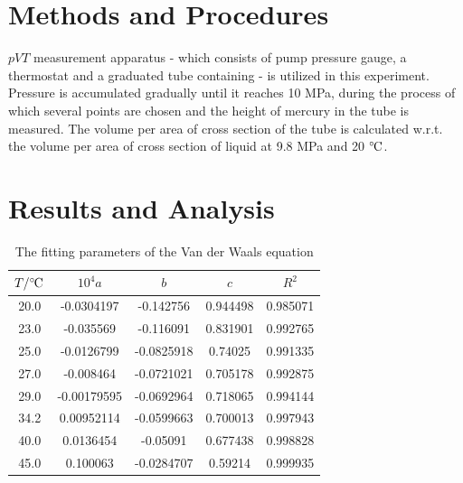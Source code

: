 \documentclass[%
 reprint,
 amsmath,amssymb,
 aps,
10.5pt,
]{revtex4-1}
\newcommand{\celsius}{\ensuremath{^\circ\hspace{-0.09em}\mathrm{C}}}
\begin{document}
\section{Methods and Procedures}
$pVT$ measurement apparatus - which consists of pump pressure gauge, a thermostat and a graduated tube containing  - is utilized in this experiment. Pressure is accumulated gradually until it reaches 10 MPa, during the process of which several points are chosen and the height of mercury in the tube is measured. The volume per area of cross section of the tube is calculated w.r.t. the volume per area of cross section of  liquid at 9.8 MPa and 20 \celsius.

\section{Results and Analysis}
\begin{table}
\centering
\caption{The fitting parameters of the Van der Waals equation}
\begin{tabular}{ccccc}\hline
$T/\celsius$ & $10^4 a$ & $b$ & $c$ & $R^2$  \\\hline
20.0 & -0.0304197 & -0.142756 & 0.944498 & 0.985071 \\
23.0 & -0.035569 & -0.116091 & 0.831901 & 0.992765 \\
25.0 & -0.0126799 & -0.0825918 & 0.74025 & 0.991335 \\
27.0 & -0.008464 & -0.0721021 & 0.705178 & 0.992875 \\
29.0 & -0.00179595 & -0.0692964 & 0.718065 & 0.994144 \\
34.2 &  0.00952114 & -0.0599663 & 0.700013 & 0.997943 \\
40.0 &  0.0136454 & -0.05091 & 0.677438 & 0.998828 \\
45.0 &  0.100063 & -0.0284707 & 0.59214 & 0.999935 \\\hline
\end{tabular}
\label{VanderWaals}
\end{table}
\end{document}
